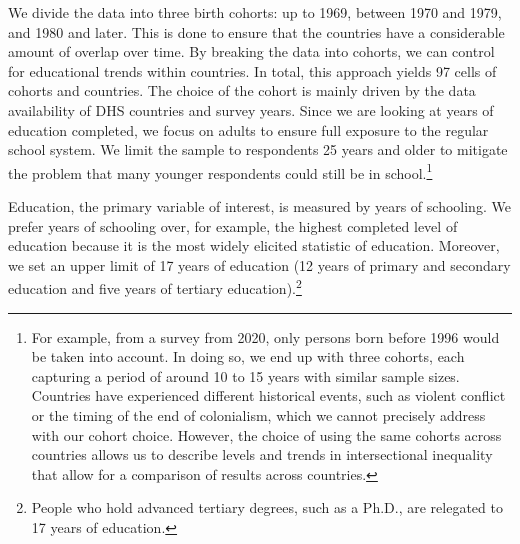 We divide the data into three birth cohorts: up to 1969, between 1970 and 1979, and 1980 and later. This is done to ensure that the countries have a considerable amount of overlap over time. By breaking the data into cohorts, we can control for educational trends within countries. In total, this approach yields 97 cells of cohorts and countries. The choice of the cohort is mainly driven by the data availability of DHS countries and survey years. Since we are looking at years of education completed, we focus on adults to ensure full exposure to the regular school system. We limit the sample to respondents 25 years and older to mitigate the problem that many younger respondents could still be in school.\footnote{For example, from a survey from 2020, only persons born before 1996 would be taken into account. In doing so, we end up with three cohorts, each capturing a period of around 10 to 15 years with similar sample sizes. Countries have experienced different historical events, such as violent conflict or the timing of the end of colonialism, which we cannot precisely address with our cohort choice. However, the choice of using the same cohorts across countries allows us to describe levels and trends in intersectional inequality that allow for a comparison of results across countries.}

Education, the primary variable of interest, is measured by years of schooling. We prefer years of schooling over, for example, the highest completed level of education because it is the most widely elicited statistic of education. Moreover, we set an upper limit of 17 years of education (12 years of primary and secondary education and five years of tertiary education).\footnote{People who hold advanced tertiary degrees, such as a Ph.D., are relegated to 17 years of education.} 

